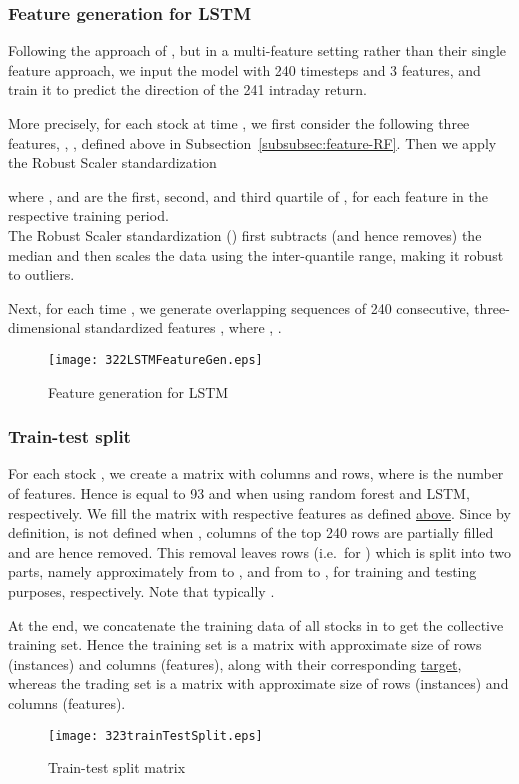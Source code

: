 \documentclass[review]{elsarticle}
\begin{document}
\subsubsection{Feature  generation for LSTM} Following the approach of \cite{krauss18}, but in a multi-feature setting rather than their single feature approach, we  
input the model with 240 timesteps and 3 features, and train it to predict the direction of the 241 intraday return. 

More precisely, for each stock  at time , we first consider the following three features, , ,  defined above in Subsection~\ref{subsubsec:feature-RF}. Then we apply the Robust Scaler standardization 

where ,  and  are the first, second, and third quartile of , 
for each feature  in the respective training period.
\\
The Robust Scaler standardization (\cite{pedregosa2011scikit}) first subtracts (and hence removes) the median and then scales the data using the inter-quantile range, making it robust to  outliers.

Next, for each time , we generate overlapping sequences  of  240  consecutive, three-dimensional standardized features  , where 
, .
\begin{figure}[H]
	\centering
	\texttt{[image: 322LSTMFeatureGen.eps]}
\hfill
	\caption{Feature  generation for LSTM}
	\label{fig:figure3.2.2.featureGenRandomLSTM}
\end{figure}



\subsubsection{Train-test split}

For each stock , we create a matrix with  columns and  rows, where  is the number of features. Hence  is equal to 93 and  when using random forest and LSTM, respectively. We fill the matrix with respective  features as defined \hyperref[subsec:features]{above}. 
Since by definition,  is not defined when , columns of the top 240 rows are partially filled and are hence removed. This removal leaves 
 rows (i.e.\ for ) which is split into two parts, namely  approximately from  to , and  from  to , for training and testing purposes, respectively. Note that typically .
\par
At the end, we concatenate the training data of all stocks in  to get the collective training set. Hence the training set is a matrix with approximate size of  rows (instances) and  columns (features), along with their corresponding \hyperref[subsec:target]{target}, whereas the 
 trading set is a matrix with approximate size of  rows (instances) and  columns (features).
\begin{figure}[h!]
 	\centering
 	
 	\texttt{[image: 323trainTestSplit.eps]} \hfill
 	\caption{Train-test split matrix}
 	\label{fig:figure3.2.3.train_est_split}
 \end{figure}
\end{document}
